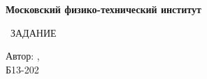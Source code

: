 \begin{titlepage}
	\clearpage\thispagestyle{empty}
	\centering
	
	\textbf{Московский физико-технический институт}
	\vspace{33ex}
	
	{\textbf{\FullCourseName}}
	
	\TaskNumber\ ЗАДАНИЕ 
	\vspace{1ex}

	\begin{flushright}
		\noindent
		Автор: {\AuthorInitials},
		\\
		Б13-202 
	\end{flushright}
	
	\vfill
	\CourseDate
	\pagebreak
\end{titlepage}